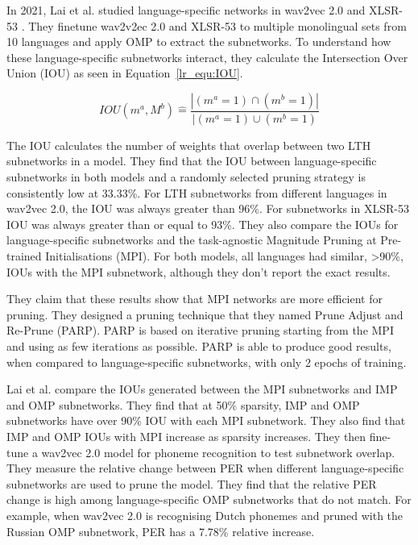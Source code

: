 In 2021, Lai et al. \cite{PARP} studied language-specific networks in wav2vec 2.0 \cite{wav2vec} and XLSR-53 \cite{XLSR-53}. They finetune wav2v2ec 2.0 and XLSR-53 to multiple monolingual sets from 10 languages and apply OMP to extract the subnetworks. To understand how these language-specific subnetworks interact, they calculate the Intersection Over Union (IOU) as seen in Equation~\ref{lr_equ:IOU}. 

\begin{equation}\label{lr_equ:IOU}
    IOU(m^a, M^b)\hat = \frac{|(m^a=1)\cap(m^b=1)|}{|(m^a=1)\cup(m^b=1)}
\end{equation}

The IOU calculates the number of weights that overlap between two LTH subnetworks in a model. They find that the IOU between language-specific subnetworks in both models and a randomly selected pruning strategy is consistently low at 33.33\%. For LTH subnetworks from different languages in wav2vec 2.0, the IOU was always greater than 96\%. For subnetworks in XLSR-53 IOU was always greater than or equal to 93\%. They also compare the IOUs for language-specific subnetworks and the task-agnostic Magnitude Pruning at Pre-trained Initialisations (MPI). For both models, all languages had similar, >90\%, IOUs with the MPI subnetwork, although they don't report the exact results. 

They claim that these results show that MPI networks are more efficient for pruning. They designed a pruning technique that they named Prune Adjust and Re-Prune (PARP). PARP is based on iterative pruning starting from the MPI and using as few iterations as possible. PARP is able to produce good results, when compared to language-specific subnetworks, with only 2 epochs of training.

Lai et al. \cite{PARP} compare the IOUs generated between the MPI subnetworks and IMP and OMP subnetworks. They find that at 50\% sparsity, IMP and OMP subnetworks have over 90\% IOU with each MPI subnetwork. They also find that IMP and OMP IOUs with MPI increase as sparsity increases. They then fine-tune a wav2vec 2.0 model for phoneme recognition to test subnetwork overlap. They measure the relative change between PER when different language-specific subnetworks are used to prune the model. They find that the relative PER change is high among language-specific OMP subnetworks that do not match. For example, when wav2vec 2.0 is recognising Dutch phonemes and pruned with the Russian OMP subnetwork, PER has a 7.78\% relative increase. 

